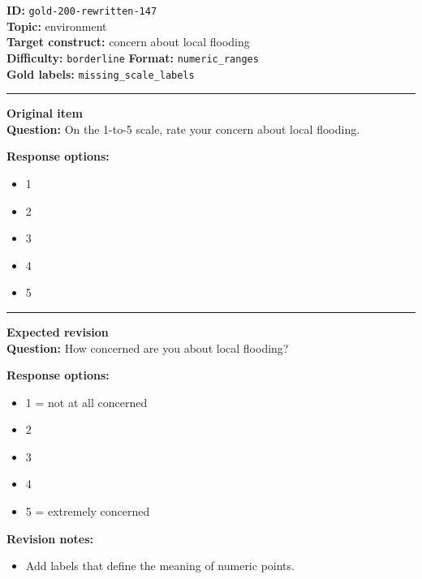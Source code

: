 \documentclass[10pt,a4paper]{article}
\newcommand{\sectionline}{\vspace{0.15em}\hrule\vspace{0.35em}}
\begin{document}
\begin{tcolorbox}[colframe=FlawRed,colback=white,colbacktitle=FlawRed!9,coltitle=black,title={Item 147\hfill Flawed item}]
\textbf{ID:} \texttt{gold-200-rewritten-147}\\
\textbf{Topic:} environment\\
\textbf{Target construct:} concern about local flooding\\
\textbf{Difficulty:} \texttt{borderline} \quad \textbf{Format:} \texttt{numeric\_ranges}\\
\textbf{Gold labels:} \texttt{missing\_scale\_labels}\\
\sectionline
\textbf{Original item}\\
\textbf{Question:} On the 1-to-5 scale, rate your concern about local flooding.
\par\textbf{Response options:}
\begin{itemize}
\item 1
\item 2
\item 3
\item 4
\item 5
\end{itemize}
\sectionline
\textbf{Expected revision}\\
\textbf{Question:} How concerned are you about local flooding?
\par\textbf{Response options:}
\begin{itemize}
\item 1 = not at all concerned
\item 2
\item 3
\item 4
\item 5 = extremely concerned
\end{itemize}
\par\textbf{Revision notes:}
\begin{itemize}
\item Add labels that define the meaning of numeric points.
\end{itemize}
\end{tcolorbox}
\end{document}
